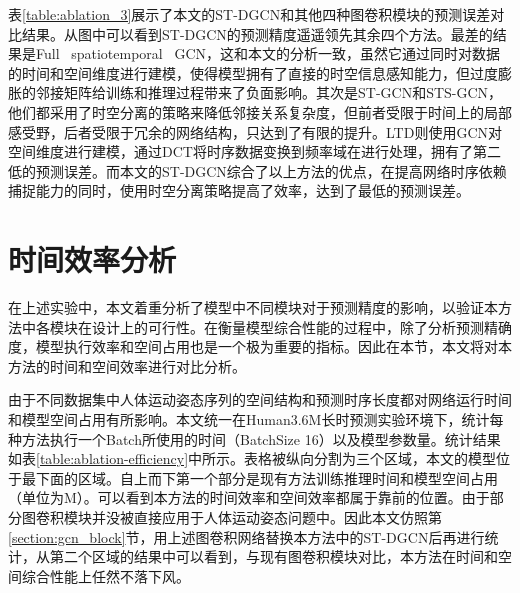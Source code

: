 表\ref{table:ablation_3}展示了本文的ST-DGCN和其他四种图卷积模块的预测误差对比结果。从图中可以看到ST-DGCN的预测精度遥遥领先其余四个方法。最差的结果是Full \ spatiotemporal \ GCN，这和本文的分析一致，虽然它通过同时对数据的时间和空间维度进行建模，使得模型拥有了直接的时空信息感知能力，但过度膨胀的邻接矩阵给训练和推理过程带来了负面影响。其次是ST-GCN和STS-GCN，他们都采用了时空分离的策略来降低邻接关系复杂度，但前者受限于时间上的局部感受野，后者受限于冗余的网络结构，只达到了有限的提升。LTD则使用GCN对空间维度进行建模，通过DCT将时序数据变换到频率域在进行处理，拥有了第二低的预测误差。而本文的ST-DGCN综合了以上方法的优点，在提高网络时序依赖捕捉能力的同时，使用时空分离策略提高了效率，达到了最低的预测误差。

\section{时间效率分析}
在上述实验中，本文着重分析了模型中不同模块对于预测精度的影响，以验证本方法中各模块在设计上的可行性。在衡量模型综合性能的过程中，除了分析预测精确度，模型执行效率和空间占用也是一个极为重要的指标。因此在本节，本文将对本方法的时间和空间效率进行对比分析。

\begin{table}[ht]
    \centering
    \caption{时间效率和模型空间占用对比}\label{table:ablation-efficiency}
    \end{table}
由于不同数据集中人体运动姿态序列的空间结构和预测时序长度都对网络运行时间和模型空间占用有所影响。本文统一在Human3.6M长时预测实验环境下，统计每种方法执行一个Batch所使用的时间（BatchSize 16）以及模型参数量。统计结果如表\ref{table:ablation-efficiency}中所示。表格被纵向分割为三个区域，本文的模型位于最下面的区域。自上而下第一个部分是现有方法训练推理时间和模型空间占用（单位为M）。可以看到本方法的时间效率和空间效率都属于靠前的位置。由于部分图卷积模块并没被直接应用于人体运动姿态问题中。因此本文仿照第\ref{section:gcn_block}节，用上述图卷积网络替换本方法中的ST-DGCN后再进行统计，从第二个区域的结果中可以看到，与现有图卷积模块对比，本方法在时间和空间综合性能上任然不落下风。

